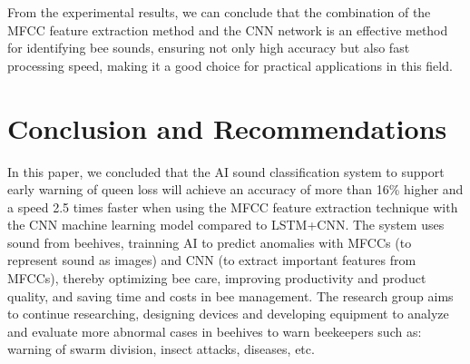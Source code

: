 \documentclass[twocolumn]{article}
\begin{document}
From the experimental results, we can conclude that the combination of the MFCC feature
extraction method and the CNN network is an effective method for identifying bee sounds,
ensuring not only high accuracy but also fast processing speed, making it a good choice
for practical applications in this field.

\section{Conclusion and Recommendations}
In this paper, we concluded that the AI sound classification system to support early
warning of queen loss will achieve an accuracy of more than 16\% higher and a speed
2.5 times faster when using the MFCC feature extraction technique with the CNN machine
learning model compared to LSTM+CNN. The system uses  sound from beehives, trainning AI
to predict anomalies with MFCCs (to represent sound as images) and CNN
(to extract important features from MFCCs), thereby optimizing bee care, improving
productivity and product quality, and saving time and costs in bee management. The
research group aims to continue researching, designing devices and developing equipment
to analyze and evaluate more abnormal cases in beehives to warn beekeepers such as:
warning of swarm division, insect attacks, diseases, etc.


\printbibliography
\end{document}

